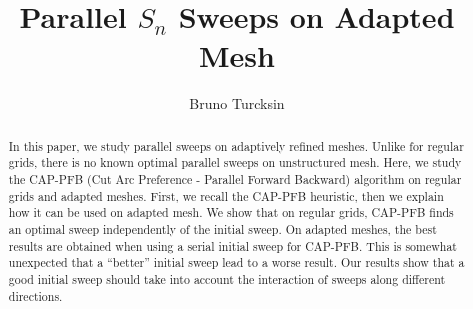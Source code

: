 \documentclass[letterpaper]{article}
\renewcommand{\(}{\left(}
\renewcommand{\)}{\right)}
\renewcommand{\[}{\left[}
\renewcommand{\]}{\right]}
\begin{document}
\title{Parallel $S_n$ Sweeps on Adapted Mesh}
\author{Bruno Turcksin} 
\date{}
\maketitle

\begin{abstract}
  In this paper, we study parallel sweeps on adaptively refined meshes. Unlike
  for regular grids, there is no known optimal parallel sweeps on unstructured
  mesh. Here, we study the CAP-PFB (Cut Arc Preference - Parallel Forward
  Backward) algorithm on regular grids and adapted meshes. First, we recall the
  CAP-PFB heuristic, then we explain how it can be used on adapted mesh. We show that on
  regular grids, CAP-PFB finds an optimal sweep independently of the initial
  sweep. On adapted meshes, the best results are obtained when using a serial
  initial sweep for CAP-PFB. This is somewhat unexpected that a ``better''
  initial sweep lead to a worse result. Our results show that a good initial
  sweep should take into account the interaction of sweeps along different
  directions.
\end{abstract}

\end{document}
